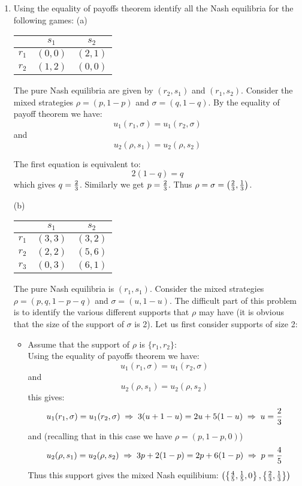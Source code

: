 \documentclass[12pt]{article}
\begin{document}
\begin{enumerate}
\item Using the equality of payoffs theorem identify all the Nash equilibria for the following games:
(a)
\begin{center}
\begin{tabular}{|c|c|c|}
\hline
 &$s_1$      &$s_2$     \\\hline
$r_1$&$(0,0)$&$(2,1)$\\\hline
$r_2$&$(1,2)$&$(0,0)$\\\hline
\end{tabular}
\end{center}


The pure Nash equilibria are given by $(r_2,s_1)$ and $(r_1,s_2)$. Consider the mixed strategies $\rho=(p,1-p)$ and $\sigma=(q,1-q)$. By the equality of payoff theorem we have:
$$u_1(r_1,\sigma)=u_1(r_2,\sigma)$$
and
$$u_2(\rho,s_1)=u_2(\rho,s_2)$$

The first equation is equivalent to:
$$2(1-q)=q$$
which gives $q={2\over3}$. Similarly we get $p={2\over3}$. Thus $\rho=\sigma=\left({2\over3},{1\over3}\right)$.

(b)

\begin{center}
\begin{tabular}{|c|c|c|}
\hline
 &$s_1$      &$s_2$     \\\hline
$r_1$&$(3,3)$&$(3,2)$\\\hline
$r_2$&$(2,2)$&$(5,6)$\\\hline
$r_3$&$(0,3)$&$(6,1)$\\\hline
\end{tabular}
\end{center}

The pure Nash equilibria is $(r_1,s_1)$. Consider the mixed strategies $\rho=(p,q,1-p-q)$ and $\sigma=(u,1-u)$. The difficult part of this problem is to identify the various different supports that $\rho$ may have (it is obvious that the size of the support of $\sigma$ is 2). Let us first consider supports of size 2:

\begin{itemize}
\item Assume that the support of $\rho$ is $\{r_1,r_2\}$:\\
Using the equality of payoffs theorem we have:
$$u_1(r_1,\sigma)=u_1(r_2,\sigma)$$
and
$$u_2(\rho,s_1)=u_2(\rho,s_2)$$
this gives:
$$u_1(r_1,\sigma)=u_1(r_2,\sigma)\;\Rightarrow\;3(u+1-u)=2u+5(1-u)\;\Rightarrow\;u={2\over3}$$
and (recalling that in this case we have $\rho=(p,1-p,0)$)
$$u_2(\rho,s_1)=u_2(\rho,s_2)\;\Rightarrow\;3p+2(1-p)=2p+6(1-p)\;\Rightarrow\;p={4\over5}$$
Thus this support gives the mixed Nash equilibium: $\left(\left\{{4\over5},{1\over5},0\right\},\left\{{2\over3},{1\over3}\right\}\right)$


\end{itemize}
\end{enumerate}
\end{document}
